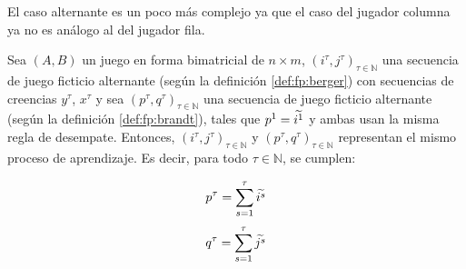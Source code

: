 El caso alternante es un poco más complejo ya que el caso del jugador columna ya no es análogo al del jugador fila.

\begin{lemma}
    Sea $(A, B)$ un juego en forma bimatricial de $n \times m$, $(i^\tau, j^\tau)_{\tau \in \mathbb{N}}$ una secuencia de juego ficticio alternante (según la definición \ref{def:fp:berger}) con secuencias de creencias $y^\tau$, $x^\tau$ y sea $(p^\tau, q^\tau)_{\tau \in \mathbb{N}}$ una secuencia de juego ficticio alternante (según la definición \ref{def:fp:brandt}), tales que $p^1 = \widetilde{i^1}$ y ambas usan la misma regla de desempate. Entonces, $(i^\tau, j^\tau)_{\tau \in \mathbb{N}}$ y $(p^\tau, q^\tau)_{\tau \in \mathbb{N}}$ representan el mismo proceso de aprendizaje. Es decir, para todo $\tau \in \mathbb{N}$, se cumplen:

    \[ p^{\tau} = \sum_{s=1}^\tau{\widetilde{i^s}} \]
    \[ q^{\tau} = \sum_{s=1}^\tau{\widetilde{j^s}} \]

\end{lemma}
